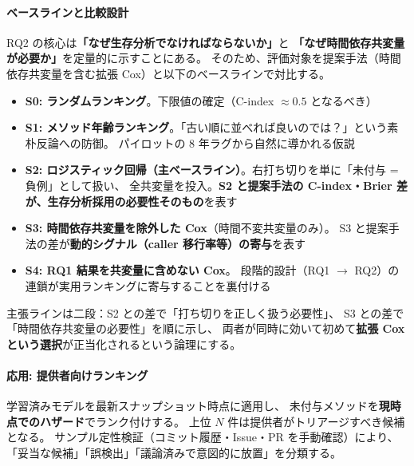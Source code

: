 \documentclass[a4paper,12pt]{article}
\begin{document}
\paragraph{ベースラインと比較設計}
RQ2 の核心は\textbf{「なぜ生存分析でなければならないか」}と
\textbf{「なぜ時間依存共変量が必要か」}を定量的に示すことにある。
そのため、評価対象を提案手法（時間依存共変量を含む拡張 Cox）と以下のベースラインで対比する。
\begin{itemize}
  \item \textbf{S0: ランダムランキング}。下限値の確定（C-index $\approx 0.5$ となるべき）
  \item \textbf{S1: メソッド年齢ランキング}。「古い順に並べれば良いのでは？」という素朴反論への防御。
        パイロットの 8 年ラグから自然に導かれる仮説
  \item \textbf{S2: ロジスティック回帰（主ベースライン）}。右打ち切りを単に「未付与 = 負例」として扱い、
        全共変量を投入。\textbf{S2 と提案手法の C-index・Brier 差が、生存分析採用の必要性そのもの}を表す
  \item \textbf{S3: 時間依存共変量を除外した Cox}（時間不変共変量のみ）。
        S3 と提案手法の差が\textbf{動的シグナル（caller 移行率等）の寄与}を表す
  \item \textbf{S4: RQ1 結果を共変量に含めない Cox}。
        段階的設計（RQ1 $\rightarrow$ RQ2）の連鎖が実用ランキングに寄与することを裏付ける
\end{itemize}
主張ラインは二段：S2 との差で「打ち切りを正しく扱う必要性」、
S3 との差で「時間依存共変量の必要性」を順に示し、
両者が同時に効いて初めて\textbf{拡張 Cox という選択}が正当化されるという論理にする。

\paragraph{応用: 提供者向けランキング}
学習済みモデルを最新スナップショット時点に適用し、
未付与メソッドを\textbf{現時点でのハザード}でランク付けする。
上位 $N$ 件は提供者がトリアージすべき候補となる。
サンプル定性検証（コミット履歴・Issue・PR を手動確認）により、
「妥当な候補」「誤検出」「議論済みで意図的に放置」を分類する。
\end{document}
